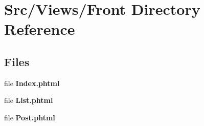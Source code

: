 \section{Src/\+Views/\+Front Directory Reference}
\label{dir_a62e0ef323735cbcff05f93535e92fbf}
\subsection*{Files}
\begin{DoxyCompactItemize}
\item 
file \textbf{ Index.\+phtml}
\item 
file \textbf{ List.\+phtml}
\item 
file \textbf{ Post.\+phtml}
\end{DoxyCompactItemize}
